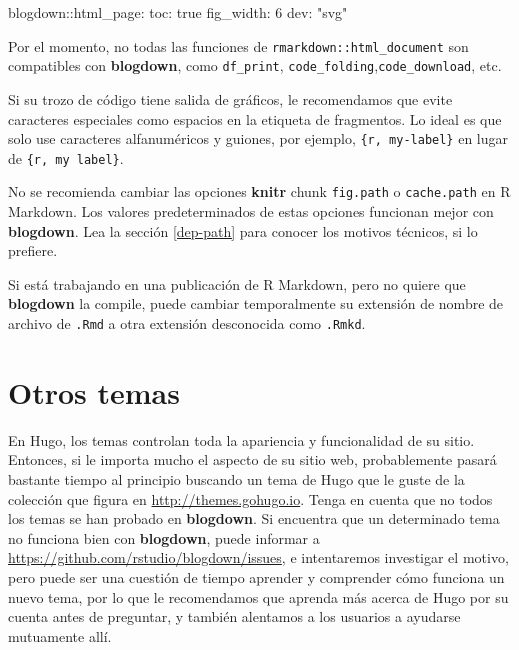\documentclass[12pt,]{krantz}
\makeatletter
\newenvironment{Shaded}{\begin{snugshade}}{\end{snugshade}}
\newcommand{\AttributeTok}[1]{\textcolor[rgb]{0.77,0.63,0.00}{#1}}
\newcommand{\FunctionTok}[1]{\textcolor[rgb]{0.00,0.00,0.00}{#1}}
\newcommand{\StringTok}[1]{\textcolor[rgb]{0.31,0.60,0.02}{#1}}
\newenvironment{kframe}{%
\medskip{}
\setlength{\fboxsep}{.8em}
 \def\at@end@of@kframe{}%
 \ifinner\ifhmode%
  \def\at@end@of@kframe{\end{minipage}}%
  \begin{minipage}{\columnwidth}%
 \fi\fi%
 \def\FrameCommand##1{\hskip\@totalleftmargin \hskip-\fboxsep
 \colorbox{shadecolor}{##1}\hskip-\fboxsep
     \hskip-\linewidth \hskip-\@totalleftmargin \hskip\columnwidth}%
 \MakeFramed {\advance\hsize-\width
   \@totalleftmargin\z@ \linewidth\hsize
   \@setminipage}}%
 {\par\unskip\endMakeFramed%
 \at@end@of@kframe}
\renewenvironment{Shaded}{\begin{kframe}}{\end{kframe}}
\theoremstyle{definition}
\theoremstyle{definition}
\theoremstyle{definition}
\theoremstyle{remark}
\makeatother
\begin{document}
\begin{Shaded}
\begin{Highlighting}[]
\FunctionTok{blogdown:}\AttributeTok{:html_page:}
  \FunctionTok{toc:}\AttributeTok{ true}
  \FunctionTok{fig_width:}\AttributeTok{ 6}
  \FunctionTok{dev:}\AttributeTok{ }\StringTok{"svg"}
\end{Highlighting}
\end{Shaded}

Por el momento, no todas las funciones de
\texttt{rmarkdown::html\_document} son compatibles con
\textbf{blogdown}, como \texttt{df\_print},
\texttt{code\_folding},\texttt{code\_download}, etc.

Si su trozo de código tiene salida de gráficos, le recomendamos que
evite caracteres especiales como espacios en la etiqueta de fragmentos.
Lo ideal es que solo use caracteres alfanuméricos y guiones, por
ejemplo,
\texttt{\textasciigrave{}\textasciigrave{}\textasciigrave{}\{r,\ my-label\}}
en lugar de
\texttt{\textasciigrave{}\textasciigrave{}\textasciigrave{}\{r,\ my\ label\}}.

No se recomienda cambiar las opciones \textbf{knitr} chunk
\texttt{fig.path} o \texttt{cache.path} en R Markdown. Los valores
predeterminados de estas opciones funcionan mejor con \textbf{blogdown}.
Lea la sección \ref{dep-path} para conocer los motivos técnicos, si lo
prefiere.

Si está trabajando en una publicación de R Markdown, pero no quiere que
\textbf{blogdown} la compile, puede cambiar temporalmente su extensión
de nombre de archivo de \texttt{.Rmd} a otra extensión desconocida como
\texttt{.Rmkd}.

\hypertarget{otros-temas}{%
\section{Otros temas}\label{otros-temas}}

En Hugo, los temas  controlan toda la apariencia y
funcionalidad de su sitio. Entonces, si le importa mucho el aspecto de
su sitio web, probablemente pasará bastante tiempo al principio buscando
un tema de Hugo que le guste de la colección que figura en
\url{http://themes.gohugo.io}. Tenga en cuenta que no todos los temas se
han probado en \textbf{blogdown}. Si encuentra que un determinado tema
no funciona bien con \textbf{blogdown}, puede informar a
\url{https://github.com/rstudio/blogdown/issues}, e intentaremos
investigar el motivo, pero puede ser una cuestión de tiempo aprender y
comprender cómo funciona un nuevo tema, por lo que le recomendamos que
aprenda más acerca de Hugo por su cuenta antes de preguntar, y también
alentamos a los usuarios a ayudarse mutuamente allí.
\end{document}
